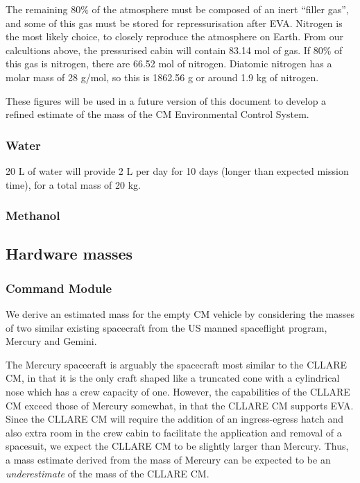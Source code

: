 \documentclass{report}
\begin{document}
The remaining 80\% of the atmosphere must be composed of an inert ``filler gas'', and some of this gas must be stored for repressurisation after EVA.  Nitrogen is the most likely choice, to closely reproduce the atmosphere on Earth.  From our calcultions above, the pressurised cabin will contain 83.14 mol of gas.  If 80\% of this gas is nitrogen, there are 66.52 mol of nitrogen.  Diatomic nitrogen has a molar mass of 28 g/mol, so this is 1862.56 g or around 1.9 kg of nitrogen.

These figures will be used in a future version of this document to develop a refined estimate of the mass of the CM Environmental Control System. 

\subsubsection{Water}

20 L of water will provide 2 L per day for 10 days (longer than expected mission time), for a total mass of 20 kg.

\subsubsection{Methanol}

\subsection{Hardware masses}

\subsubsection{Command Module}

We derive an estimated mass for the empty CM vehicle by considering the masses of two similar existing spacecraft from the US manned spaceflight program, Mercury and Gemini.

The Mercury spacecraft is arguably the spacecraft most similar to the CLLARE CM, in that it is the only craft shaped like a truncated cone with a cylindrical nose which has a crew capacity of one.  However, the capabilities of the CLLARE CM exceed those of Mercury somewhat, in that the CLLARE CM supports EVA.  Since the CLLARE CM will require the addition of an ingress-egress hatch and also extra room in the crew cabin to facilitate the application and removal of a spacesuit, we expect the CLLARE CM to be slightly larger than Mercury.  Thus, a mass estimate derived from the mass of Mercury can be expected to be an \emph{underestimate} of the mass of the CLLARE CM.
\end{document}
